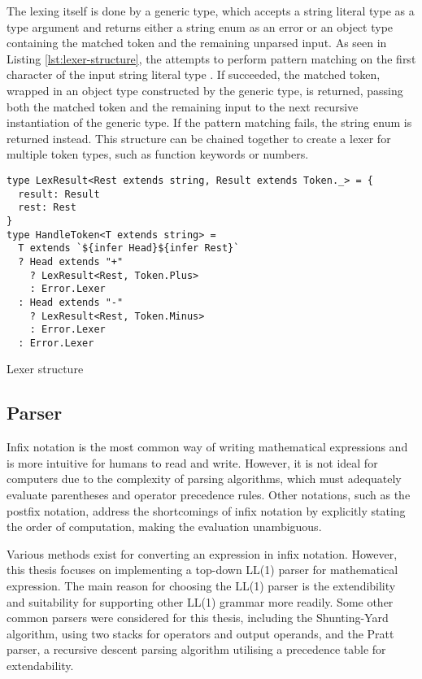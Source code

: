 The lexing itself is done by a generic type, which accepts a string literal type as a type argument and returns either a string enum as an error or an object type containing the matched token and the remaining unparsed input. As seen in Listing \ref{lst:lexer-structure}, the  attempts to perform pattern matching on the first character of the input string literal type . If succeeded, the matched token, wrapped in an object type constructed by the  generic type, is returned, passing both the matched token and the remaining input to the next recursive instantiation of the  generic type. If the pattern matching fails, the  string enum is returned instead. This structure can be chained together to create a lexer for multiple token types, such as function keywords or numbers.

\begin{listing}[ht]
  \begin{verbatim}
type LexResult<Rest extends string, Result extends Token._> = {
  result: Result
  rest: Rest
}
type HandleToken<T extends string> = 
  T extends `${infer Head}${infer Rest}`
  ? Head extends "+"
    ? LexResult<Rest, Token.Plus>
    : Error.Lexer
  : Head extends "-"
    ? LexResult<Rest, Token.Minus>
    : Error.Lexer
  : Error.Lexer
\end{verbatim}
  \caption{Lexer structure}\label{lst:lexer-structure}
\end{listing}

\subsection{Parser}

Infix notation is the most common way of writing mathematical expressions and is more intuitive for humans to read and write. However, it is not ideal for computers due to the complexity of parsing algorithms, which must adequately evaluate parentheses and operator precedence rules. Other notations, such as the postfix notation, address the shortcomings of infix notation by explicitly stating the order of computation, making the evaluation unambiguous.

Various methods exist for converting an expression in infix notation. However, this thesis focuses on implementing a top-down LL(1) parser for mathematical expression. The main reason for choosing the LL(1) parser is the extendibility and suitability for supporting other LL(1) grammar more readily. Some other common parsers were considered for this thesis, including the Shunting-Yard algorithm, using two stacks for operators and output operands, and the Pratt parser, a recursive descent parsing algorithm utilising a precedence table for extendability.

